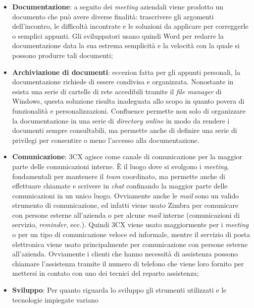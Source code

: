 \begin{itemize}
      \item \textbf{Documentazione}: a seguito dei \textit{meeting} aziendali viene prodotto un documento che può 
            avere diverse finalità: trascrivere gli argomenti dell'incontro, le difficoltà incontrate e le soluzioni da 
            applicare per correggerle o semplici appunti. Gli sviluppatori usano quindi Word per redarre la documentazione 
            data la sua estrema semplicità e la velocità con la quale si possono produrre tali documenti;
      \item \textbf{Archiviazione di documenti}: eccezion fatta per gli appunti personali, la documentazione richiede di 
            essere condivisa e organizzata. Nonostante in {\company} esista una serie di cartelle di rete accedibili tramite 
            il \textit{file manager} di Windows, questa soluzione risulta inadeguata allo scopo in quanto povera di funzionalità 
            e personalizzazioni. Confluence permette non solo di organizzare la documentazione in una serie di \textit{directory 
            online} in modo da rendere i documenti sempre consultabili, ma permette anche di definire una serie di privilegi per 
            consentire o meno l'accesso alla documentazione.
      \item \textbf{Comunicazione}: 3CX agisce come canale di comunicazione per la maggior parte delle comunicazioni interne. 
            È il luogo dove si svolgono i \textit{meeting}, fondamentali per mantenere il \textit{team} coordinato, ma permette 
            anche di effettuare chiamate e scrivere in \textit{chat} confinando la maggior parte delle comunicazioni in un unico 
            luogo. Ovviamente anche le \textit{mail} sono un valido strumento di comunicazione, ed infatti viene usato Zimbra 
            per comunicare con persone esterne all'azienda o per alcune \textit{mail} interne (comunicazioni di servizio, 
            \textit{reminder}, ecc.). Quindi 3CX viene usato maggiormente per i \textit{meeting} o per un tipo di 
            comunicazione veloce ed informale, mentre il servizio di posta elettronica viene usato principalmente 
            per comunicazione con persone esterne all'azienda. Ovviamente i clienti che hanno necessità di assistenza 
            possono chiamare l'assistenza tramite il numero di telefono che viene loro fornito per mettersi in contato con 
            uno dei tecnici del reparto assistenza;
      \item \textbf{Sviluppo}: Per quanto riguarda lo sviluppo gli strumenti utilizzati e le tecnologie impiegate variano 

\end{itemize}
